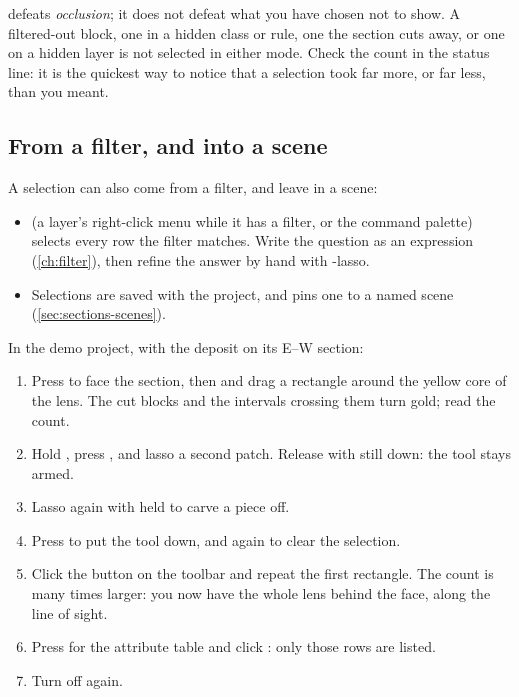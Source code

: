 \begin{caution}
 defeats \emph{occlusion}; it does not defeat what you have chosen not to show. A filtered-out block, one in a hidden class or rule, one the section cuts away, or one on a hidden layer is not selected in either mode. Check the count in the status line: it is the quickest way to notice that a selection took far more, or far less, than you meant.
\end{caution}

\subsection{From a filter, and into a scene}
A selection can also come from a filter, and leave in a scene:

\begin{itemize}
\item {} (a layer's right-click menu while it has a filter, or the command palette) selects every row the filter matches. Write the question as an expression (\cref{ch:filter}), then refine the answer by hand with -lasso.
\item Selections are saved with the project, and  pins one to a named scene (\cref{sec:sections-scenes}).
\end{itemize}

\begin{tryit}
In the demo project, with the deposit on its E–W section:
\begin{enumerate}
\item Press  to face the section, then  and drag a rectangle around the yellow core of the lens. The cut blocks and the intervals crossing them turn gold; read the count.
\item Hold , press , and lasso a second patch. Release with  still down: the tool stays armed.
\item Lasso again with  held to carve a piece off.
\item Press  to put the tool down, and  again to clear the selection.
\item Click the  button on the toolbar and repeat the first rectangle. The count is many times larger: you now have the whole lens behind the face, along the line of sight.
\item Press  for the attribute table and click : only those rows are listed.
\item Turn  off again.
\end{enumerate}
\end{tryit}

